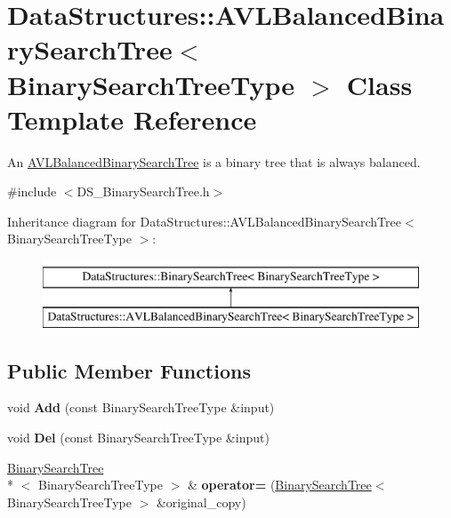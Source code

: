 \hypertarget{class_data_structures_1_1_a_v_l_balanced_binary_search_tree}{\section{Data\-Structures\-:\-:A\-V\-L\-Balanced\-Binary\-Search\-Tree$<$ Binary\-Search\-Tree\-Type $>$ Class Template Reference}
\label{class_data_structures_1_1_a_v_l_balanced_binary_search_tree}
}


An \hyperlink{class_data_structures_1_1_a_v_l_balanced_binary_search_tree}{A\-V\-L\-Balanced\-Binary\-Search\-Tree} is a binary tree that is always balanced.  




{\ttfamily \#include $<$D\-S\-\_\-\-Binary\-Search\-Tree.\-h$>$}

Inheritance diagram for Data\-Structures\-:\-:A\-V\-L\-Balanced\-Binary\-Search\-Tree$<$ Binary\-Search\-Tree\-Type $>$\-:\begin{figure}[H]
\begin{center}
\leavevmode
\includegraphics[height=2.000000cm]{class_data_structures_1_1_a_v_l_balanced_binary_search_tree}
\end{center}
\end{figure}
\subsection*{Public Member Functions}
\begin{DoxyCompactItemize}
\item 
\hypertarget{class_data_structures_1_1_a_v_l_balanced_binary_search_tree_ae287d3f7d7f370e1e3397778e0b6d4e4}{void {\bfseries Add} (const Binary\-Search\-Tree\-Type \&input)}\label{class_data_structures_1_1_a_v_l_balanced_binary_search_tree_ae287d3f7d7f370e1e3397778e0b6d4e4}

\item 
\hypertarget{class_data_structures_1_1_a_v_l_balanced_binary_search_tree_a8725967ec8b587761f94cdceb9c86bc4}{void {\bfseries Del} (const Binary\-Search\-Tree\-Type \&input)}\label{class_data_structures_1_1_a_v_l_balanced_binary_search_tree_a8725967ec8b587761f94cdceb9c86bc4}

\item 
\hypertarget{class_data_structures_1_1_a_v_l_balanced_binary_search_tree_a50a0e82ab44a6354bc45d96e31c6c0b8}{\hyperlink{class_data_structures_1_1_binary_search_tree}{Binary\-Search\-Tree}\\*
$<$ Binary\-Search\-Tree\-Type $>$ \& {\bfseries operator=} (\hyperlink{class_data_structures_1_1_binary_search_tree}{Binary\-Search\-Tree}$<$ Binary\-Search\-Tree\-Type $>$ \&original\-\_\-copy)}\label{class_data_structures_1_1_a_v_l_balanced_binary_search_tree_a50a0e82ab44a6354bc45d96e31c6c0b8}

\end{DoxyCompactItemize}
